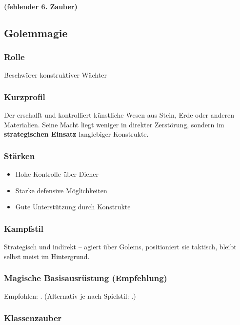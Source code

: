\paragraph*{(fehlender 6. Zauber)}

\subsection{Golemmagie}

\subsubsection*{Rolle}
Beschwörer konstruktiver Wächter

\subsubsection*{Kurzprofil}
Der  erschafft und kontrolliert künstliche Wesen aus Stein, Erde oder anderen Materialien.
Seine Macht liegt weniger in direkter Zerstörung, sondern im \textbf{strategischen Einsatz} langlebiger Konstrukte.

\subsubsection*{Stärken}
\begin{itemize}
	\item Hohe Kontrolle über Diener
	\item Starke defensive Möglichkeiten
	\item Gute Unterstützung durch Konstrukte
\end{itemize}

\subsubsection*{Kampfstil}
Strategisch und indirekt – agiert über Golems, positioniert sie taktisch, bleibt selbst meist im Hintergrund.

\subsubsection*{Magische Basisausrüstung (Empfehlung)}
Empfohlen: .  
(Alternativ je nach Spielstil: .)

\subsubsection*{Klassenzauber}

